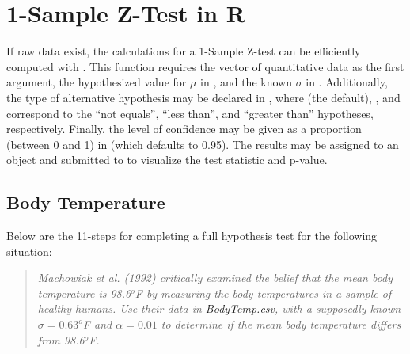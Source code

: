 \documentclass[10pt,openany]{book}\usepackage[]{graphicx}\usepackage[]{color}
\begin{document}
\section{1-Sample Z-Test in R}
\vspace*{-4pt}
If raw data exist, the calculations for a 1-Sample Z-test can be efficiently computed with . This function requires the vector of quantitative data as the first argument, the hypothesized value for $\mu$ in , and the known $\sigma$ in . Additionally, the type of alternative hypothesis may be declared in , where  (the default), , and  correspond to the ``not equals'', ``less than'', and ``greater than'' hypotheses, respectively. Finally, the level of confidence may be given as a proportion (between 0 and 1) in  (which defaults to 0.95). The  results may be assigned to an object and submitted to  to visualize the test statistic and p-value.

\vspace*{-4pt}
\subsection{Body Temperature}
\vspace*{-4pt}
Below are the 11-steps  for completing a full hypothesis test for the following situation:
\vspace*{-8pt}
\begin{quote}
\textsl{Machowiak et al. (1992) critically examined the belief that the mean body temperature is 98.6$^{o}$F by measuring the body temperatures in a sample of healthy humans. Use their data in \href{https://raw.githubusercontent.com/droglenc/NCData/master/BodyTemp.csv}{BodyTemp.csv}, with a supposedly known $\sigma=0.63^{o}$F and $\alpha=0.01$ to determine if the mean body temperature differs from 98.6$^{o}$F.}
\end{quote}
\end{document}

